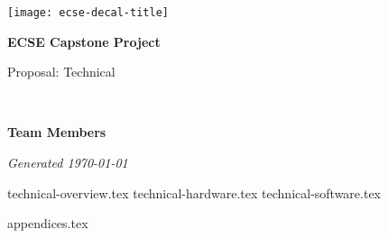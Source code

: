\documentclass{capstone}
\begin{document}

\titlepage
	{\texttt{[image: ecse-decal-title]}}
	{
		\centering\sffamily
		{\Huge\bfseries ECSE Capstone Project\par}
		\vspace{16pt} 
		{\LARGE Proposal: Technical\par} 
		\vspace{24pt}
		{\huge\bfseries \teamname\par} %
	}


~\vfill

\noindent \textbf{Team Members}
\teammembers

\noindent \textit{Generated \today}

\tableofcontents

{technical-overview.tex}
{technical-hardware.tex}
{technical-software.tex}

\begin{appendices}
{appendices.tex}
\end{appendices}
\end{document}
